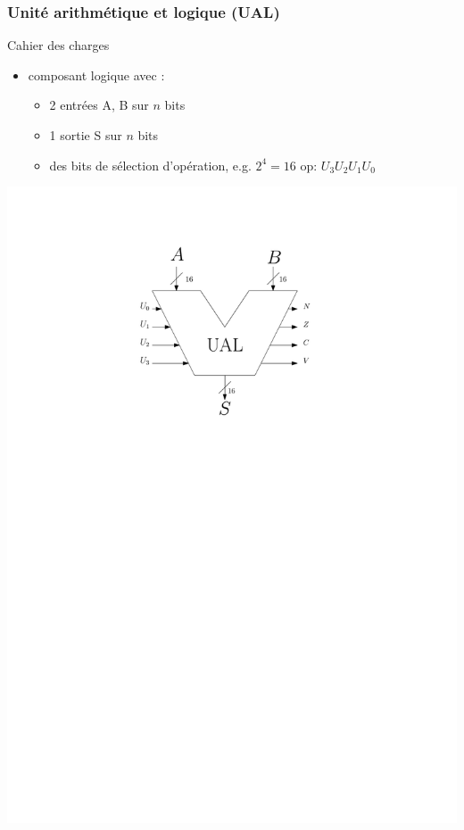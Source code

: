 \documentclass{beamer}
\begin{document}
\begin{frame}
\frametitle{Unité arithmétique et logique (UAL)}
\begin{block}{Cahier des charges}
\begin{itemize}
\item composant logique avec :
\begin{itemize}
\item 2 entrées A, B sur $n$ bits
\item 1 sortie S sur $n$ bits
\item des bits de sélection d'opération, e.g. $2^4 = 16$ op: $U_3U_2U_1U_0$
\end{itemize}
\end{itemize}
\centering\includegraphics[width=0.3\linewidth]{Figs/ual.pdf}
\end{block}

\end{frame}
\end{document}
